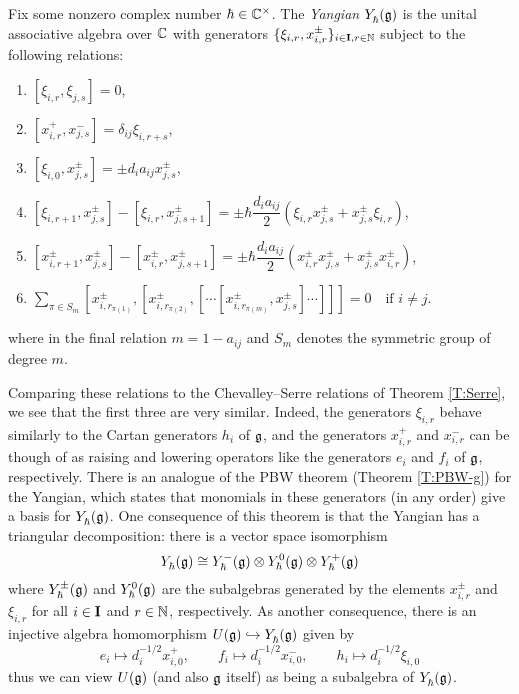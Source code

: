 \begin{definition}\label{D:Y}
    Fix some nonzero complex number $\hbar\in\C^\times$.
    The \emph{Yangian} $\Yhg$ is the unital associative algebra over $\C$ with generators $\{\xi_{i,r}, x^\pm_{i,r}\}_{i\in\I,r\in\N}$ subject to the following relations:
    \begin{enumerate}
        \item $[\xi_{i,r},\xi_{j,s}] = 0$,
        \item $[x^+_{i,r},x^-_{j,s}] = \delta_{ij}\xi_{i,r+s}$,
        \item $[\xi_{i,0},x^\pm_{j,s}] = \pm d_ia_{ij}x^\pm_{j,s}$,
        \item $[\xi_{i,r+1},x^\pm_{j,s}]-[\xi_{i,r},x^\pm_{j,s+1}] = \pm\hbar\dfrac{d_ia_{ij}}{2}(\xi_{i,r}x^\pm_{j,s}+x^\pm_{j,s}\xi_{i,r})$,
        \item $[x^\pm_{i,r+1},x^\pm_{j,s}]-[x^\pm_{i,r},x^\pm_{j,s+1}] = \pm\hbar\dfrac{d_ia_{ij}}{2}(x^\pm_{i,r}x^\pm_{j,s}+x^\pm_{j,s}x^\pm_{i,r})$,
        \item $\displaystyle\sum\limits_{\pi\in S_m}[x^\pm_{i,r_{\pi(1)}}, [x^\pm_{i,r_{\pi(2)}}, [\cdots[x^\pm_{i,r_{\pi(m)}}, x^\pm_{j,s}]\cdots]]]=0 \quad\text{if } i\neq j$.
    \end{enumerate}
    where in the final relation $m=1-a_{ij}$ and $S_m$ denotes the symmetric group of degree $m$.
\end{definition}

Comparing these relations to the Chevalley--Serre relations of Theorem \ref{T:Serre}, we see that the first three are very similar.
Indeed, the generators $\xi_{i,r}$ behave similarly to the Cartan generators $h_i$ of $\g$, and the generators $x^+_{i,r}$ and $x^-_{i,r}$ can be though of as raising and lowering operators like the generators $e_i$ and $f_i$ of $\g$, respectively.
There is an analogue of the PBW theorem (Theorem \ref{T:PBW-g}) for the Yangian, which states that monomials in these generators (in any order) give a basis for $\Yhg$.
One consequence of this theorem is that the Yangian has a triangular decomposition: there is a vector space isomorphism
\[\Yhg \cong \Yhg[-]\otimes\Yhg[0]\otimes\Yhg[+]\]
where $\Yhg[\pm]$ and $\Yhg[0]$ are the subalgebras generated by the elements $x^\pm_{i,r}$ and $\xi_{i,r}$ for all $i\in\I$ and $r\in\N$, respectively.
As another consequence, there is an injective algebra homomorphism $\Ug\inj\Yhg$ given by
\[e_i\mapsto d_i^{-1/2}x^+_{i,0}, \qquad f_i\mapsto d_i^{-1/2}x^-_{i,0}, \qquad h_i\mapsto d_i^{-1/2}\xi_{i,0}\]
thus we can view $\Ug$ (and also $\g$ itself) as being a subalgebra of $\Yhg$.

